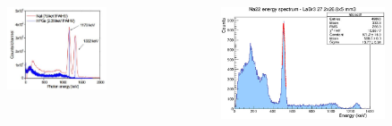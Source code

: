 \begin{frame}[plain]
    \begin{columns}
        \begin{column}{0.5\textwidth}
            \begin{figure}
                \centering
                \includegraphics[width=0.8\textwidth, frame]{images/co60_theoretical.jpg}
            \end{figure}
        \end{column}
        \begin{column}{0.5\textwidth}
            \begin{figure}
                \centering
                \includegraphics[width=0.99\textwidth, frame]{images/na22_theoretical.jpg}
            \end{figure}
        \end{column}
    \end{columns}

\end{frame}
